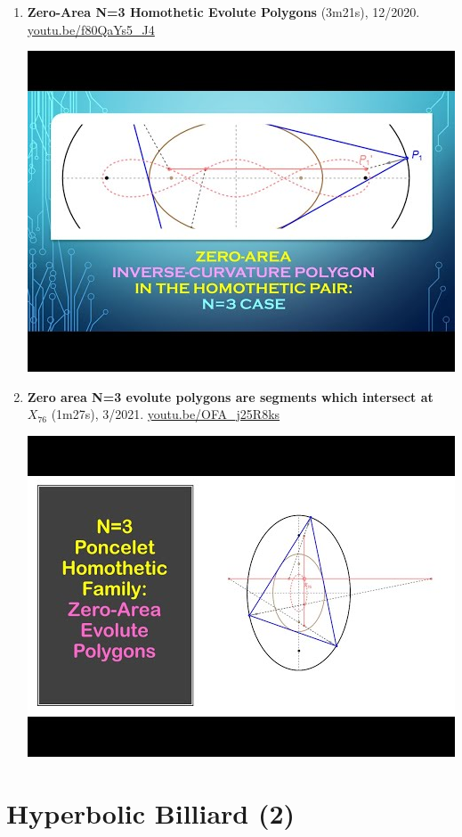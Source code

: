 \documentclass[12pt]{article}
\begin{document}
\begin{enumerate}[resume]
% 
\item \textbf{Zero-Area N=3 Homothetic Evolute Polygons} (3m21s), 12/2020. \href{https://youtu.be/f80QaYs5_J4}{\url{youtu.be/f80QaYs5\_J4}}
\begin{center}\includegraphics[width=.5\textwidth]{pics/f80QaYs5_J4.jpg}\end{center}
% 
\item \textbf{Zero area N=3 evolute polygons are segments which intersect at $X_{76}$} (1m27s), 3/2021. \href{https://youtu.be/OFA_j25R8ks}{\url{youtu.be/OFA\_j25R8ks}}
\begin{center}\includegraphics[width=.5\textwidth]{pics/OFA_j25R8ks.jpg}\end{center}
% 
\end{enumerate}

\section{Hyperbolic Billiard (2)}
\end{document}
